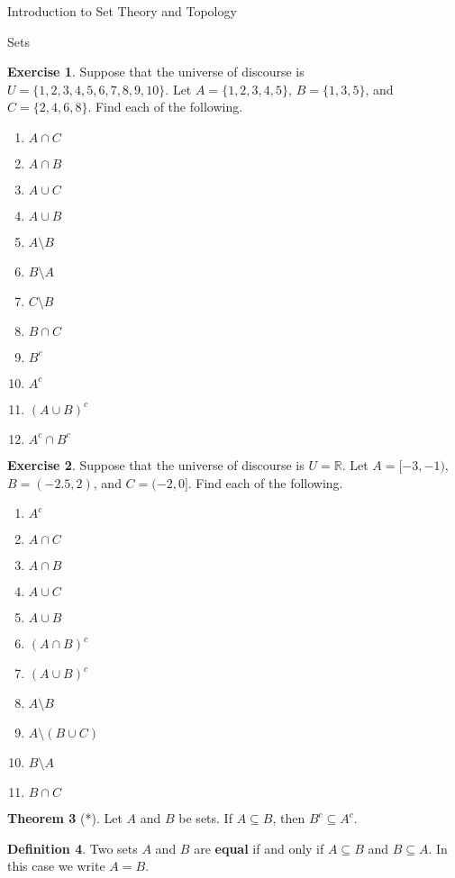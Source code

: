 \documentclass[11pt]{article}
\theoremstyle{definition}
\newtheorem{theorem}{Theorem}[section]
\newtheorem{definition}[theorem]{Definition}
\newtheorem{exercise}[theorem]{Exercise}
\begin{document}
\begin{section}{Introduction to Set Theory and Topology}
\begin{subsection}{Sets}
\begin{exercise}
Suppose that the universe of discourse is $U=\{1,2,3,4,5,6,7,8,9,10\}$.  Let $A=\{1, 2, 3, 4, 5\}$, $B=\{1, 3, 5\}$, and $C=\{2, 4, 6, 8\}$.  Find each of the following.
\begin{enumerate}
  \item $A \cap C$
  \item $A \cap B$
  \item $A \cup C$
  \item $A \cup B$
  \item $A\setminus B$
  \item $B \setminus A$
  \item $C \setminus B$
  \item $B \cap C$
  \item $B^c$
  \item $A^c$
  \item $(A\cup B)^c$
  \item $A^c\cap B^c$
\end{enumerate}
\end{exercise}

\begin{exercise}
Suppose that the universe of discourse is $U=\mathbb{R}$.  Let $A=[-3,-1)$, $B=(-2.5,2)$, and $C=(-2,0]$.  Find each of the following.
\begin{enumerate}
\item $A^c$
  \item $A \cap C$
  \item $A \cap B$
  \item $A \cup C$
  \item $A \cup B$
  \item $(A\cap B)^c$
  \item $(A\cup B)^c$
  \item $A \setminus B$
  \item $A\setminus (B \cup C)$
  \item $B \setminus A$
  \item $B \cap C$
\end{enumerate}
\end{exercise}

\begin{theorem}[*]
Let $A$ and $B$ be sets.  If $A \subseteq B$, then $B^c \subseteq A^c$.
\end{theorem}

\begin{definition}
Two sets $A$ and $B$ are \textbf{equal} if and only if $A \subseteq B$ and $B \subseteq A$.  In this case we write $A = B$.
\end{definition}


\end{subsection}
\end{section}
\end{document}
